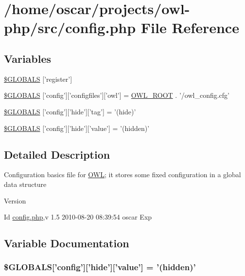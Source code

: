 \section{/home/oscar/projects/owl-\/php/src/config.php File Reference}
\label{config_8php}
\subsection*{Variables}
\begin{DoxyCompactItemize}
\item 
\hyperlink{config_8php_a6cc1ef3a8c20d69988531d27f931855b}{\$GLOBALS} \mbox{[}'register'\mbox{]}
\item 
\hyperlink{config_8php_a36e909583250c43d72bdc7c09e2d4a20}{\$GLOBALS} \mbox{[}'config'\mbox{]}\mbox{[}'configfiles'\mbox{]}\mbox{[}'owl'\mbox{]} = \hyperlink{index_8php_a35612f9a6bd7277982731a74593272c4}{OWL\_\-ROOT} . '/owl\_\-config.cfg'
\item 
\hyperlink{config_8php_a15cc7b8e0baf358db666b97bd9c7fcf5}{\$GLOBALS} \mbox{[}'config'\mbox{]}\mbox{[}'hide'\mbox{]}\mbox{[}'tag'\mbox{]} = '(hide)'
\item 
\hyperlink{config_8php_a7b69aee0b150d2e6556beaff4a99e589}{\$GLOBALS} \mbox{[}'config'\mbox{]}\mbox{[}'hide'\mbox{]}\mbox{[}'value'\mbox{]} = '(hidden)'
\end{DoxyCompactItemize}


\subsection{Detailed Description}
Configuration basics file for \hyperlink{classOWL}{OWL}; it stores some fixed configuration in a global data structure \begin{DoxyVersion}{Version}

\end{DoxyVersion}
\begin{DoxyParagraph}{Id}
\hyperlink{config_8php}{config.php},v 1.5 2010-\/08-\/20 08:39:54 oscar Exp 
\end{DoxyParagraph}


\subsection{Variable Documentation}
\subsubsection[{\$GLOBALS}]{\setlength{\rightskip}{0pt plus 5cm}\$GLOBALS\mbox{[}'config'\mbox{]}\mbox{[}'hide'\mbox{]}\mbox{[}'value'\mbox{]} = '(hidden)'}\label{config_8php_a7b69aee0b150d2e6556beaff4a99e589}

